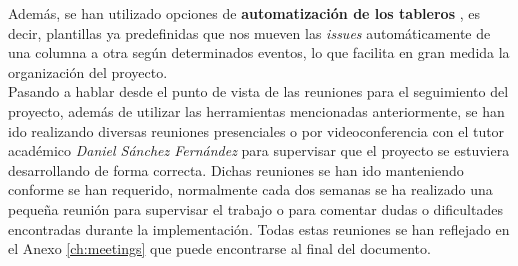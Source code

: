 Además, se han utilizado opciones de \textbf{automatización de los tableros}
\cite{automatic-project-board}, es decir, plantillas ya predefinidas que nos mueven las
\textit{issues} automáticamente de una columna a otra según determinados eventos, lo que
facilita en gran medida la organización del proyecto.\\

Pasando a hablar desde el punto de vista de las reuniones para el seguimiento del proyecto,
además de utilizar las herramientas mencionadas anteriormente, se han ido realizando diversas
reuniones presenciales o por videoconferencia con el tutor académico \textit{Daniel Sánchez
Fernández} para supervisar que el proyecto se estuviera desarrollando de forma correcta.
Dichas reuniones se han ido manteniendo conforme se han requerido, normalmente cada dos
semanas se ha realizado una pequeña reunión para supervisar el trabajo o para comentar dudas
o dificultades encontradas durante la implementación. Todas estas reuniones se han reflejado
en el Anexo \ref{ch:meetings} que puede encontrarse al final del documento.